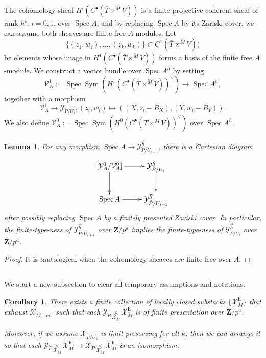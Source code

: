 \documentclass[11pt]{amsart}
\newtheorem{lem}{Lemma}
\newtheorem{cor}{Corollary}
\numberwithin{thm}{section}
\numberwithin{lem}{section}
\numberwithin{cor}{section}
\numberwithin{prop}{section}
\numberwithin{exam}{section}
\numberwithin{dfn}{section}
\newcommand{\Sym}{\operatorname{Sym}}
\newcommand{\red}{{\operatorname{red}}}
\newcommand{\spec}{\operatorname{Spec}}
\newcommand{\cX}{\mathcal{X}}
\newcommand{\cY}{\mathcal{Y}}
\newcommand{\cV}{\mathcal{V}}
\newcommand{\bM}{\breve{M}}
\newcommand{\bP}{\breve{P}}
\newcommand{\Z}{\mathbf{Z}}
\begin{document}
The cohomology sheaf
$H^i(C^\bullet(\bar T\times^{\bM}V))$
is a finite projective coherent sheaf
of rank $h^i$, $i=0,1$,
over $\spec A$,
and by replacing $\spec A$
by its Zariski cover,
we can assume both sheaves are finite free $A$-modules.
Let
\[
\{(z_1, w_1), \dots, (z_k, w_k)\}
\subset C^1(\bar T\times^{\bM}V))
\]
be elements whose image
in 
$H^1(C^\bullet(\bar T\times^{\bM}V))$
forms a basis of the finite free $A$-module.
We construct a vector bundle
over $\spec A^h$ by setting
\[
\cV^1_A:=
\underline{\spec}\Sym (H^1(C^\bullet(\bar T\times^{\bM}V))^\vee)
\to \spec A^h,
\]
together with a morphism
\[
\cV^1_A
\to
\cY_{\bP/U_i},
(z_i, w_i)
\mapsto
((X, z_i-B_X),(Y, w_i-B_Y)).
\]
We also define
$\cV^0_A:=
\underline{\spec}\Sym (H^0(C^\bullet(\bar T\times^{\bM}V))^\vee)$
over $\spec A^h$.

\begin{lem}
For any morphism
$\spec A\to \cY^{\vec h}_{\bP/U_{i+1}}$,
there is a Cartesian diagram
\[
\xymatrix{
[\cV^1_A/\cV^0_A] \ar[d]\ar[r]
&
\cY^{\vec h}_{\bP/U_i}\ar[d]
\\
\spec A\ar[r]
&
\cY^{\vec h}_{\bP/U_{i+1}}
}
\]
after possibly replacing $\spec A$
by a finitely presented Zariski cover.
In particular,
the
finite-type-ness of
$\cY_{\bP/U_{i+1}}^{\vec h}$
over $\Z/p^a$
implies
the finite-type-ness of
$\cY_{\bP/U_i}^{\vec h}$
over $\Z/p^a$.
\label{lem:parabolic}
\end{lem}

\begin{proof}
It is tautological
when the cohomology sheaves
are finite free over $A$.
\end{proof}

\subsection{}
We start a new subsection to clear all temporary assumptions
and notations.

\begin{cor}
There exists a finite collection
of locally closed substacks
$\{\cX_{\bM}^{\mathbf h}\}$
that exhaust $\cX_{\bM,\red}$
such that
each
$\cY_{\bP}\underset{\cX_{\bM}}{\times}\cX_{\bM}^{\mathbf h}$
is of finite presentation over $\Z/p^a$.

Moreover,
if we assume $\cX_{\bP/U_k}$ is limit-preserving
for all $k$, then we can arrange it so that
each
$
\cY_{\bP}\underset{\cX_{\bM}}{\times}\cX_{\bM}^{\mathbf h}
\to
\cX_{\bP}\underset{\cX_{\bM}}{\times}\cX_{\bM}^{\mathbf h}$
is an isomorphism.
\label{cor:parabolic}
\end{cor}
\end{document}
